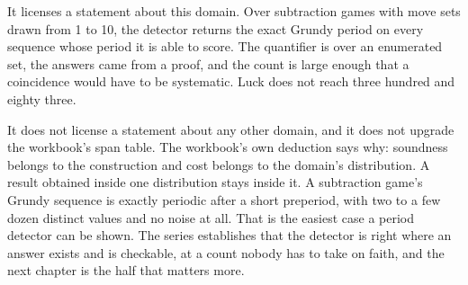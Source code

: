 It licenses a statement about this domain. Over subtraction games with move sets drawn from 1 to 10,
the detector returns the exact Grundy period on every sequence whose period it is able to score. The
quantifier is over an enumerated set, the answers came from a proof, and the count is large enough
that a coincidence would have to be systematic. Luck does not reach three hundred and eighty three.

It does not license a statement about any other domain, and it does not upgrade the workbook's span
table. The workbook's own deduction says why: soundness belongs to the construction and cost belongs
to the domain's distribution. A result obtained inside one distribution stays inside it. A
subtraction game's Grundy sequence is exactly periodic after a short preperiod, with two to a few
dozen distinct values and no noise at all. That is the easiest case a period detector can be shown. The series establishes that the detector is right where an answer exists and is checkable,
at a count nobody has to take on faith, and the next chapter is the half that matters more.
